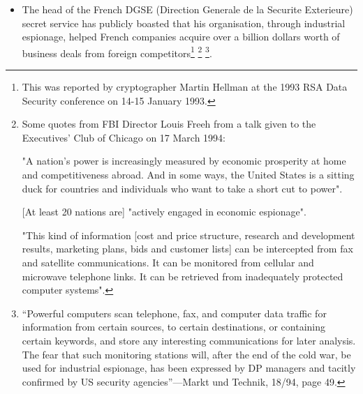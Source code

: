 \begin{itemize}

\item The head of the French DGSE (Direction Generale de la Securite
      Exterieure) secret service has publicly boasted that his organisation,
      through industrial espionage, helped French companies acquire over a
      billion dollars worth of business deals from foreign competitors\footnote{
              This was reported by cryptographer Martin Hellman at the 1993 RSA
              Data Security conference on 14-15 January 1993.} \footnote{
              Some quotes from FBI Director Louis Freeh from a talk given to
              the Executives' Club of Chicago on 17 March 1994:

              "A nation's power is increasingly measured by economic prosperity
               at home and competitiveness abroad.  And in some ways, the
               United States is a sitting duck for countries and individuals
               who want to take a short cut to power".

               [At least 20 nations are] "actively engaged in economic
               espionage".

              "This kind of information [cost and price structure, research and
               development results, marketing plans, bids and customer lists]
               can be intercepted from fax and satellite communications.  It
               can be monitored from cellular and microwave telephone links.
               It can be retrieved from inadequately protected computer
               systems".
} \footnote{
\edef\@currentlabel{\csname p@footnote\endcsname\csname thefootnote\endcsname}
\label{footnote6}
		``Powerful computers scan telephone, fax, and computer data
               	traffic for information from certain sources, to certain
               	destinations, or containing certain keywords, and store any
               	interesting communications for later analysis.  The fear that
               	such monitoring stations will, after the end of the cold war, be
               	used for industrial espionage, has been expressed by DP managers
               	and tacitly confirmed by US security agencies''---Markt und
               	Technik, 18/94, page 49.
}.


\end{itemize}
